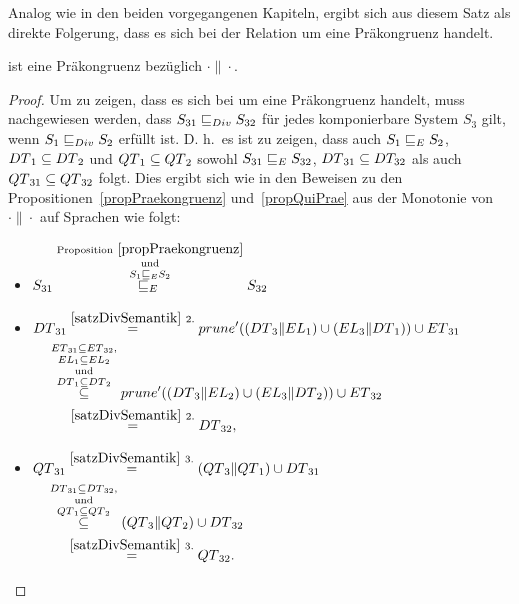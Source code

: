 Analog wie in den beiden vorgegangenen Kapiteln, ergibt sich aus diesem Satz
als direkte Folgerung, dass es sich bei der Relation \DRel{} um eine
Präkongruenz handelt.

\begin{prop}
\label{propDivPrae}
  \DRel{} ist eine Präkongruenz bezüglich $\cdot\|\cdot$.
\end{prop}

\begin{proof}
  Um zu zeigen, dass es sich bei \DRel{} um eine Präkongruenz handelt, muss
  nachgewiesen werden, dass $S_{31}\sqsubseteq _{Div}{} S_{32}$ für jedes komponierbare
  System $S_3$ gilt, wenn $S_1\sqsubseteq _{Div}{} S_2$ erfüllt ist.  D.  h.\   es     ist
  zu zeigen, dass auch $S_1\sqsubseteq _E{} S_2$, $DT{}_1\subseteq DT{}_2$ und
  $QT{}_1\subseteq QT{}_2$ sowohl $S_{31}\sqsubseteq _E{} S_{32}$,
  $DT{}_{31}\subseteq DT_{32}$ als auch $QT{}_{31}\subseteq QT{}_{32}$
  folgt. Dies ergibt sich wie in den Beweisen zu den
  Propositionen~\ref{propPraekongruenz} und~\ref{propQuiPrae} aus der Monotonie
  von $\cdot\|\cdot$ auf Sprachen wie folgt:
  \begin{itemize}
    \item $\begin{aligned}[t]
        S_{31}
        \overset{\mathrm{Proposition}~\ref{propPraekongruenz}}{%
        \overset{\mathrm{und}}{\overset{S_1\ERel{} S_2}{\ERel{}}}} S_{32}
    \end{aligned}$
    \item $\begin{aligned}[t]
        \DT{}_{31} &\overset{\ref{satzDivSemantik}~2.}{=}
        \prunenew{}((\DT{}_3\|\EL{}_1) \cup (\EL{}_3\|\DT{}_1)) \cup
        \ET{}_{31}\\
        &\hspace{-0.5cm}\overset{\ET{}_{31}\subseteq
      \ET{}_{32},}{\overset{\EL{}_1\subseteq
      \EL{}_2}{\overset{\mathrm{und}}{\overset{\DT{}_1\subseteq
    \DT{}_2}{\subseteq}}}} \prunenew{}((\DT{}_3\|\EL{}_2) \cup
    (\EL{}_3\|\DT{}_2)) \cup \ET{}_{32}\\
      &\overset{\ref{satzDivSemantik}~2.}{=} \DT{}_{32},
    \end{aligned}$
    \item $\begin{aligned}[t]
        \QT{}_{31} &\overset{\ref{satzDivSemantik}~3.}{=} (\QT{}_3\|\QT{}_1)
        \cup \DT{}_{31}\\
        &\hspace{-0.5cm}\overset{\DT{}_{31}\subseteq
      \DT{}_{32},}{\overset{\mathrm{und}}{\overset{\QT{}_1\subseteq
      \QT{}_2}{\subseteq}}} (\QT{}_3\|\QT{}_2) \cup \DT{}_{32}\\
      &\overset{\ref{satzDivSemantik}~3.}{=} \QT{}_{32}.
    \end{aligned}$
  \end{itemize}
\end{proof}

